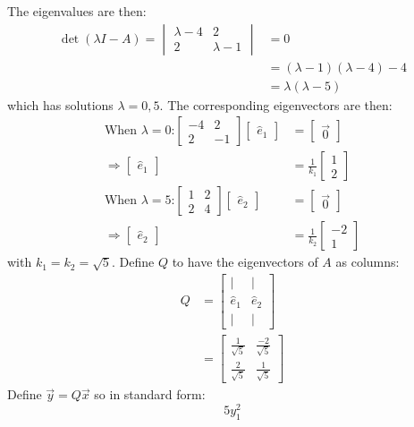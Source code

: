 \documentclass[11pt]{homework}
\begin{document}
The eigenvalues are then:
\begin{align*}
\det(\lambda I -A) = 
  \begin{vmatrix}
  \lambda-4 & 2 \\
  2 & \lambda-1 
  \end{vmatrix}
  &= 0 \\
  &= (\lambda-1)(\lambda-4)-4 \\
  &= \lambda(\lambda -5)
\end{align*}
which has solutions $\lambda=0,5$.
The corresponding eigenvectors are then:
\begin{align*}
\text{When $\lambda = 0$:}
  \begin{bmatrix}
    -4 & 2 \\
    2 & -1
  \end{bmatrix}
  \begin{bmatrix}
    \hat e_1
  \end{bmatrix}
  &=
  \begin{bmatrix}
   \vec 0
  \end{bmatrix} \\
  \Rightarrow
  \begin{bmatrix}
    \hat e_1
  \end{bmatrix}
  &=
  \frac{1}{k_1}
  \begin{bmatrix}
    1 \\
    2
  \end{bmatrix} \\
\text{When $\lambda = 5$:}
  \begin{bmatrix}
    1 & 2 \\
    2 & 4
  \end{bmatrix}
  \begin{bmatrix}
    \hat e_2
  \end{bmatrix}
  &=
  \begin{bmatrix}
   \vec 0
  \end{bmatrix} \\
  \Rightarrow
  \begin{bmatrix}
    \hat e_2
  \end{bmatrix}
  &=
  \frac{1}{k_2}
  \begin{bmatrix}
    -2 \\
    1
  \end{bmatrix}
\end{align*}
with $k_1 = k_2 = \sqrt{5}$.
Define $Q$ to have the eigenvectors of $A$ as columns:
\begin{align*}
Q &=
  \begin{bmatrix}
   | & | \\
   \hat e_1 & \hat e_2  \\
   | & | 
  \end{bmatrix} \\
  &=
  \begin{bmatrix}
  \frac{1}{\sqrt{5}} & \frac{-2}{\sqrt{5}} \\
  \frac{2}{\sqrt{5}} & \frac{1}{\sqrt{5}} 
  \end{bmatrix}
\end{align*}
Define $\vec y = Q \vec x$ so 
in standard form:
\begin{equation*}
  5 y_1^2
\end{equation*}
\end{document}
